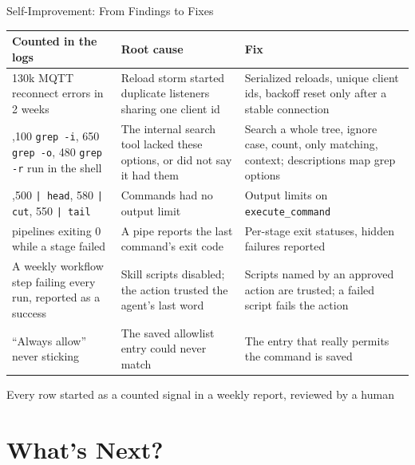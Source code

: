 \documentclass[aspectratio=169,10pt]{beamer}
\begin{document}
\begin{frame}{Self-Improvement: From Findings to Fixes}
\scriptsize
\renewcommand{\arraystretch}{1.25}
\begin{tabular}{@{}>{\raggedright\arraybackslash}p{4.1cm}>{\raggedright\arraybackslash}p{4.2cm}>{\raggedright\arraybackslash}p{4.8cm}@{}}
\toprule
\textbf{Counted in the logs} & \textbf{Root cause} & \textbf{Fix} \\
\midrule
130k MQTT reconnect errors in 2 weeks & Reload storm started duplicate listeners sharing one client id & Serialized reloads, unique client ids, backoff reset only after a stable connection \\
1,100 \texttt{grep -i}, 650 \texttt{grep -o}, 480 \texttt{grep -r} run in the shell & The internal search tool lacked these options, or did not say it had them & Search a whole tree, ignore case, count, only matching, context; descriptions map grep options \\
1,500 \texttt{| head}, 580 \texttt{| cut}, 550 \texttt{| tail} & Commands had no output limit & Output limits on \texttt{execute\_command} \\
48 pipelines exiting 0 while a stage failed & A pipe reports the last command's exit code & Per-stage exit statuses, hidden failures reported \\
A weekly workflow step failing every run, reported as a success & Skill scripts disabled; the action trusted the agent's last word & Scripts named by an approved action are trusted; a failed script fails the action \\
``Always allow'' never sticking & The saved allowlist entry could never match & The entry that really permits the command is saved \\
\bottomrule
\end{tabular}

\vfill
\centering
\color{gray} Every row started as a counted signal in a weekly report, reviewed by a human
\end{frame}

\section{What's Next?}
\end{document}
